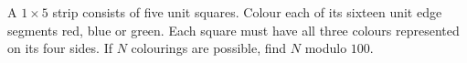 A $1\times5$ strip consists of five unit squares. Colour each of its sixteen unit edge segments red, blue or green. Each square must have all three colours represented on its four sides. If $N$ colourings are possible, find $N$ modulo $100$.
